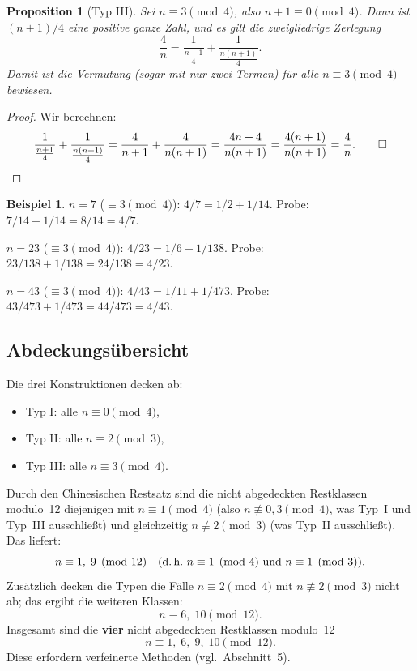 \documentclass[12pt,a4paper]{amsart}
\newtheorem{proposition}[theorem]{Proposition}
\theoremstyle{definition}
\newtheorem{example}[theorem]{Beispiel}
\begin{document}
\begin{proposition}[Typ III]\label{prop:typIII}
Sei $n \equiv 3 \pmod 4$, also $n + 1 \equiv 0 \pmod 4$.
Dann ist $(n+1)/4$ eine positive ganze Zahl, und es gilt die
zweigliedrige Zerlegung
\[
  \frac{4}{n} = \frac{1}{\frac{n+1}{4}} + \frac{1}{\frac{n(n+1)}{4}}.
\]
Damit ist die Vermutung (sogar mit nur zwei Termen) für alle
$n \equiv 3 \pmod 4$ bewiesen.
\end{proposition}

\begin{proof}
Wir berechnen:
\[
  \frac{1}{\frac{n+1}{4}} + \frac{1}{\frac{n(n+1)}{4}}
  = \frac{4}{n+1} + \frac{4}{n(n+1)}
  = \frac{4n + 4}{n(n+1)}
  = \frac{4(n+1)}{n(n+1)}
  = \frac{4}{n}. \qed
\]
\end{proof}

\begin{example}
$n = 7$ ($\equiv 3 \pmod 4$): $4/7 = 1/2 + 1/14$.
Probe: $7/14 + 1/14 = 8/14 = 4/7$. \checkmark

$n = 23$ ($\equiv 3 \pmod 4$): $4/23 = 1/6 + 1/138$.
Probe: $23/138 + 1/138 = 24/138 = 4/23$. \checkmark

$n = 43$ ($\equiv 3 \pmod 4$): $4/43 = 1/11 + 1/473$.
Probe: $43/473 + 1/473 = 44/473 = 4/43$. \checkmark
\end{example}

\subsection{Abdeckungsübersicht}

Die drei Konstruktionen decken ab:
\begin{itemize}
  \item Typ I: alle $n \equiv 0 \pmod 4$,
  \item Typ II: alle $n \equiv 2 \pmod 3$,
  \item Typ III: alle $n \equiv 3 \pmod 4$.
\end{itemize}
Durch den Chinesischen Restsatz sind die nicht abgedeckten Restklassen
modulo~12 diejenigen mit $n \equiv 1 \pmod{4}$ (also $n \not\equiv 0,3
\pmod 4$, was Typ~I und Typ~III ausschließt) und gleichzeitig
$n \not\equiv 2 \pmod{3}$ (was Typ~II ausschließt).  Das liefert:
\[
  n \equiv 1,\; 9 \pmod{12}
  \quad\text{(d.\,h.\ }n \equiv 1 \pmod 4\text{ und }n \equiv 1 \pmod 3\text{)}.
\]
Zusätzlich decken die Typen die Fälle $n \equiv 2 \pmod 4$ mit
$n \not\equiv 2 \pmod 3$ nicht ab; das ergibt die weiteren Klassen:
\[
  n \equiv 6,\; 10 \pmod{12}.
\]
Insgesamt sind die \textbf{vier} nicht abgedeckten Restklassen modulo~12
\[
  n \equiv 1,\; 6,\; 9,\; 10 \pmod{12}.
\]
Diese erfordern verfeinerte Methoden (vgl.\ Abschnitt~5).
\end{document}
